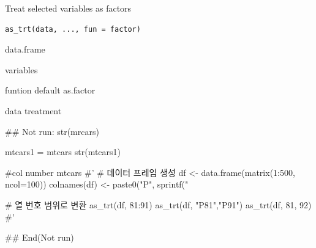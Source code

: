 \documentclass[a4paper]{book}
\begin{document}
%
\begin{Description}
Treat selected variables as factors
\end{Description}
%
\begin{Usage}
\begin{verbatim}
as_trt(data, ..., fun = factor)
\end{verbatim}
\end{Usage}
%
\begin{Arguments}
\begin{ldescription}
\item[\code{data}] data.frame

\item[\code{...}] variables

\item[\code{fun}] funtion default as.factor
\end{ldescription}
\end{Arguments}
%
\begin{Value}
data treatment
\end{Value}
%
\begin{Examples}
\begin{ExampleCode}
\#\# Not run: 
 str(mrcars)

 mtcars1 = mtcars %
 str(mtcars1)

 #col number
 mtcars%
#'
# 데이터 프레임 생성
df <- data.frame(matrix(1:500, ncol=100))
colnames(df) <- paste0("P", sprintf("%

# 열 번호 범위로 변환
as_trt(df, 81:91)%
as_trt(df, "P81","P91")%
as_trt(df, 81, 92)%
#'



## End(Not run)

\end{ExampleCode}
\end{Examples}
\end{document}
